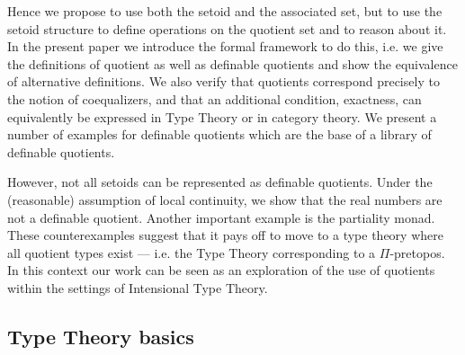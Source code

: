\documentclass[envcountsame]{llncs}
\begin{document}
Hence we propose to use both the setoid
and the associated set, but to use the setoid structure to define
operations on the quotient set and to reason about it. In the present
paper we introduce the formal framework to do this, i.e. we give the definitions of  quotient as well as definable quotients and show the
equivalence of alternative definitions. We also verify that quotients
correspond precisely to the notion of coequalizers, and that an
additional condition, exactness, can equivalently be expressed in Type
Theory or in category theory. We present a number of examples for
definable quotients which are the base of a library of definable
quotients.

However, not all setoids can be represented as definable
quotients. Under the (reasonable) assumption of local continuity, we
show that the real numbers are not a definable quotient. Another
important example is the partiality monad. These counterexamples
suggest that it pays off to move to a type theory where all
quotient types exist --- i.e. the Type Theory corresponding to a
$\Pi$-pretopos. In this context our work can be seen as an exploration
of the use of quotients within the settings of Intensional Type
Theory.

\subsection{Type Theory basics}
\label{sec:type-theory-basics}
\end{document}

